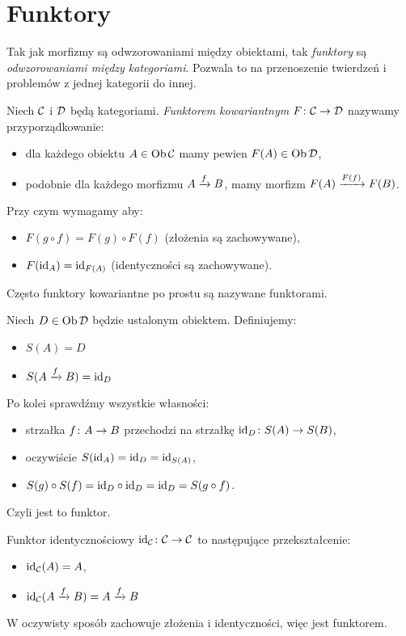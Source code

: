 \section{Funktory}
\begin{idea}
  Tak jak morfizmy są odwzorowaniami między obiektami, tak \emph{funktory} są \emph{odwzorowaniami między kategoriami}. Pozwala to na przenoszenie twierdzeń i problemów z jednej kategorii do innej.
\end{idea}

\begin{defn}
  Niech $\C$ i $\D$ będą kategoriami. \emph{Funktorem kowariantnym} $\morph F\C\D$ nazywamy przyporządkowanie:
  \begin{itemize}
    \item dla każdego obiektu $A\in \Ob\C$ mamy pewien $F(A)\in \Ob\D$,
    \item podobnie dla każdego morfizmu $\morpharr fAB$, mamy morfizm $\morpharr {F(f)}{F(A)}{F(B)}$.
  \end{itemize}
 Przy czym wymagamy aby:
  \begin{itemize}
    \item $F(g\circ f) = F(g)\circ F(f)$ (złożenia są zachowywane),
    \item $F(\id A) = \id{F(A)}$ (identyczności są zachowywane).
  \end{itemize}
  Często funktory kowariantne po prostu są nazywane funktorami.
\end{defn}

\begin{exmp}
  Niech $D\in \Ob \D$ będzie ustalonym obiektem. Definiujemy:
  \begin{itemize}
    \item $S(A)=D$
    \item $S(\morpharr fAB) = \id D$
  \end{itemize}
  Po kolei sprawdźmy wszystkie własności:
  \begin{itemize}
    \item strzałka $\morph fAB$ przechodzi na strzałkę $\morph{\id D}{S(A)}{S(B)}$,
    \item oczywiście $S(\id A)=\id {D} = \id {S(A)}$,
    \item $S(g)\circ S(f) = \id D\circ \id D = \id D = S(g\circ f)$.
  \end{itemize}
  Czyli jest to funktor.
\end{exmp}

\begin{exmp}
  Funktor identycznościowy $\morph {\id \C}\C \C$ to następujące przekształcenie:
  \begin{itemize}
    \item $\id \C(A) = A$,
    \item $\id \C(\morpharr fAB) = \morpharr fAB$
  \end{itemize}
  W oczywisty sposób zachowuje złożenia i identyczności, więc jest funktorem.
\end{exmp}

